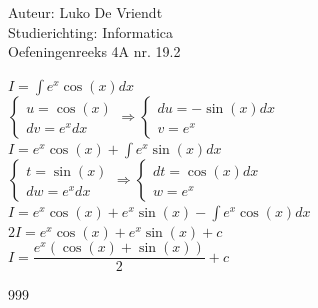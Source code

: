 \documentclass[a4paper]{article}
\begin{document}
\noindent \large Auteur: Luko De Vriendt\\
\noindent \large Studierichting: Informatica\\
\noindent \large Oefeningenreeks 4A nr. 19.2\\

\medskip

\normalsize

$I = \displaystyle \int e^x \cos (x)dx$ \\

$\left \{
\begin{array}{l}
     u = \cos (x) \\
     dv = e^xdx
\end{array}
\right .
\Rightarrow
\left \{
\begin{array}{l}
     du = -\sin (x)dx \\
     v = e^x
\end{array}
\right .$ \\

$I = e^x \cos (x) + \displaystyle \int e^x \sin(x)dx$ \\

$\left \{
\begin{array}{l}
     t = \sin (x) \\
     dw = e^xdx
\end{array}
\right .
\Rightarrow
\left \{
\begin{array}{l}
     dt = \cos (x)dx \\
     w = e^x
\end{array}
\right .$ \\

$I = e^x \cos (x) + e^x \sin (x) - \displaystyle \int e^x \cos(x)dx$ \\

$2I =  e^x \cos (x) + e^x \sin (x) + c$ \\

$I =  \dfrac{e^x \left( \cos (x) + \sin (x) \right)}{2} + c$ \\



\begin{thebibliography}{999}
\end{thebibliography}
\end{document}
